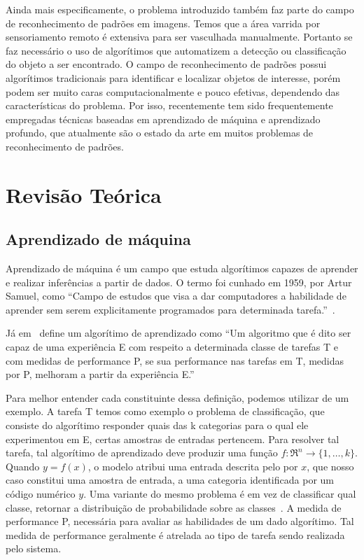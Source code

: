Ainda mais especificamente, o problema introduzido também faz parte do campo de reconhecimento de padrões em imagens. Temos que a área varrida por sensoriamento remoto é extensiva para ser vasculhada manualmente. Portanto se faz necessário o uso de algorítimos que automatizem a detecção ou classificação do objeto a ser encontrado.
O campo de reconhecimento de padrões possui algorítimos tradicionais para identificar e localizar objetos de interesse, porém podem ser muito caras computacionalmente e pouco efetivas, dependendo das características do problema. Por isso, recentemente tem sido frequentemente empregadas técnicas baseadas em aprendizado de máquina e aprendizado profundo, que atualmente são o estado da arte em muitos problemas de reconhecimento de padrões.


\section{Revisão Teórica}\label{sec:Cap2_revisao_teorica}

\subsection{Aprendizado de máquina}\label{sec:aprendizado_maquina}

Aprendizado de máquina é um campo que estuda algorítimos capazes de aprender e realizar inferências a partir de dados. O termo foi cunhado em 1959, por Artur Samuel, como “Campo de estudos que visa a dar computadores a habilidade de aprender sem serem explicitamente programados para determinada tarefa.”~\cite{Samuel1959SomeSI}.

Já em~\cite{Mitchell97} define um algorítimo de aprendizado como “Um algoritmo que é dito ser capaz de uma experiência E com respeito a determinada classe de tarefas T e com medidas de performance P, se sua performance nas tarefas em T, medidas por P, melhoram a partir da experiência E.”

Para melhor entender cada constituinte dessa definição, podemos utilizar de um exemplo. A tarefa T temos como exemplo o problema de classificação, que consiste do algorítimo responder quais das k categorias para o qual ele experimentou em E, certas amostras de entradas pertencem. Para resolver tal tarefa, tal algorítimo de aprendizado deve produzir uma função \(f:\Re^n\rightarrow \{1,\ldots,k\}\). Quando \( y=f(x) \), o modelo atribui uma entrada descrita pelo por \(x\), que nosso caso constitui uma amostra de entrada, a uma categoria identificada por um código numérico \(y\). Uma variante do mesmo problema é em vez de classificar qual classe, retornar a distribuição de probabilidade sobre as classes~\cite{GoodBengCour16}. A medida de performance P, necessária para avaliar as habilidades de um dado algorítimo. Tal medida de performance geralmente é atrelada ao tipo de tarefa sendo realizada pelo sistema. 

